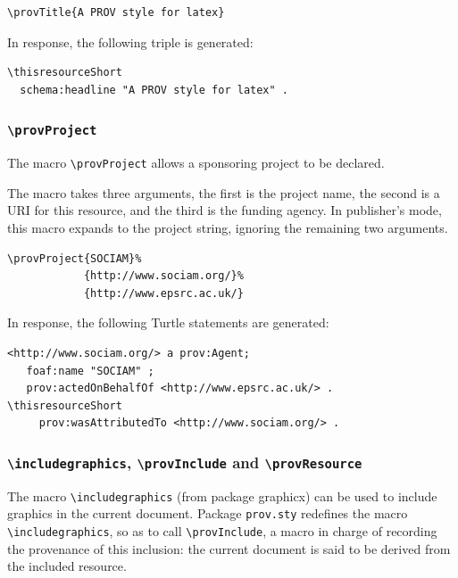 \documentclass{sigplanconf}
\newcommand{\provstyMacro}[1]{{\tt \textbackslash prov{#1}}\xspace}
\newcommand{\latexMacro}[1]{{\tt \textbackslash#1}\xspace}
\newcommand{\provsty}{{\tt prov.sty}\xspace}
\begin{document}
{\footnotesize
\begin{Verbatim}
\provTitle{A PROV style for latex}
\end{Verbatim}
}

\noindent In response, the following triple is generated:

{\footnotesize
\begin{Verbatim}[commandchars=\\\{\}]
\thisresourceShort
  schema:headline "A PROV style for latex" .
\end{Verbatim}
}

\subsubsection{\provstyMacro{Project}}\label{project:macro}


The macro \provstyMacro{Project} allows a sponsoring project to be declared.

The macro takes three arguments, the first is the project name, the
second is a URI for this resource, and the third is the funding
agency.  In publisher's mode, this macro expands to the project
string, ignoring the remaining two arguments.

{\footnotesize
\begin{Verbatim}
\provProject{SOCIAM}%
            {http://www.sociam.org/}%
            {http://www.epsrc.ac.uk/}
\end{Verbatim}
}

\noindent In response, the following Turtle statements are generated:

{\footnotesize
\begin{Verbatim}[commandchars=\\\{\}]
<http://www.sociam.org/> a prov:Agent;
   foaf:name "SOCIAM" ; 
   prov:actedOnBehalfOf <http://www.epsrc.ac.uk/> .
\thisresourceShort
     prov:wasAttributedTo <http://www.sociam.org/> .
\end{Verbatim}
}

\subsubsection{\latexMacro{includegraphics}, \provstyMacro{Include} and \provstyMacro{Resource}}\label{include:macro}

The macro \latexMacro{includegraphics} (from package graphicx) can be
used to include graphics in the current document.  Package \provsty
redefines the macro \latexMacro{includegraphics}, so as to
call \provstyMacro{Include}, a macro in charge of recording the
provenance of this inclusion: the current document is said to be
derived from the included resource.
\end{document}
